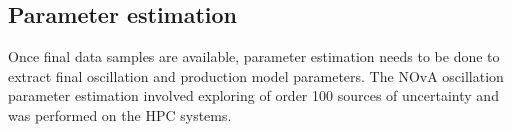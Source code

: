 \documentclass[../main-v1.tex]{subfiles}
\begin{document}








\subsection{Parameter estimation}
Once final data samples are available, parameter estimation needs to be done to extract final oscillation and production  model parameters.  The NOvA oscillation parameter estimation \cite{NOvA:2021nfi} involved exploring of order 100 sources of uncertainty and was performed on the  HPC systems.  
\end{document}
